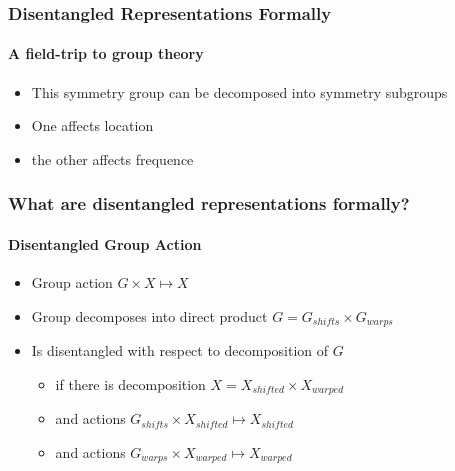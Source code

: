 \documentclass[9pt]{beamer}
\begin{document}



\begin{frame}
\frametitle{Disentangled Representations Formally}
\framesubtitle{A field-trip to group theory}
\begin{itemize}%
	\item This symmetry group can be decomposed into symmetry subgroups
	\item One affects location
	\item the other affects frequence
\end{itemize}
\end{frame} 

\begin{frame}
\frametitle{What are disentangled representations formally? }
\framesubtitle{Disentangled Group Action}
\begin{itemize}%
	\item Group action $G \times X \mapsto X$
	\item Group decomposes into direct product $G = G_{shifts} \times G_{warps}$
	\item Is disentangled with respect to decomposition of $G$
	\begin{itemize}
		\item if there is decomposition $X = X_{shifted} \times X_{warped}$
		\item and actions $G_{shifts} \times X_{shifted} \mapsto X_{shifted}$
		\item and actions $G_{warps} \times X_{warped} \mapsto X_{warped}$
	\end{itemize}
\end{itemize}
\end{frame} 
\end{document}
